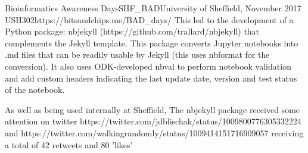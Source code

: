 \begin{event}{Bioinformatics Awareness Days}{SHF_BAD}{University of Sheffield, November 2017 }{USH}{30}{2}{https://bitsandchips.me/BAD_days/}
This led to the development of a Python package: nbjekyll (https://github.com/trallard/nbjekyll) that complements the Jekyll template. This package converts Jupyter notebooks into .md files that can be readily usable by Jekyll (this uses nbformat for the conversion). It also uses ODK-developed nbval to perform notebook validation and add custom headers indicating the last update date, version and test status of the notebook.

As well as being used internally at Sheffield, The nbjekyll package received some attention on twitter https://twitter.com/jdblischak/status/1009800776305332224 and https://twitter.com/walkingrandomly/status/1009414151716909057 receiving a total of 42 retweets and 80 'likes'

\end{event}
